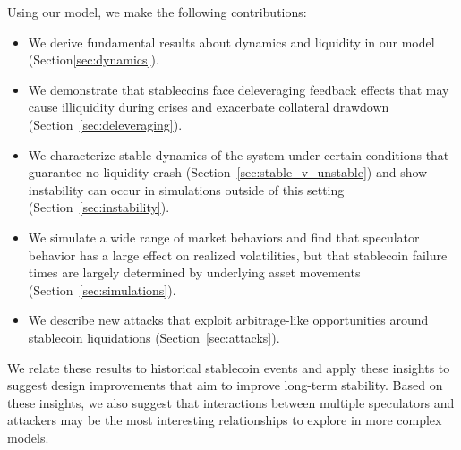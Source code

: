 Using our model, we make the following contributions:
\begin{itemize}
	\item We derive fundamental results about dynamics and liquidity in our model (Section\ref{sec:dynamics}).
	
	\item We demonstrate that stablecoins face deleveraging feedback effects that may cause illiquidity during crises and exacerbate collateral drawdown (Section~\ref{sec:deleveraging}).
	
	\item We characterize stable dynamics of the system under certain conditions that guarantee no liquidity crash (Section~\ref{sec:stable_v_unstable}) and show instability can occur in simulations outside of this setting (Section~\ref{sec:instability}).
	
	\item We simulate a wide range of market behaviors and find that speculator behavior has a large effect on realized volatilities, but that stablecoin failure times are largely determined by underlying asset movements (Section~\ref{sec:simulations}).
	
	\item We describe new attacks that exploit arbitrage-like opportunities around stablecoin liquidations (Section~\ref{sec:attacks}).
\end{itemize}
We relate these results to historical stablecoin events and apply these insights to suggest design improvements that aim to improve long-term stability. Based on these insights, we also suggest that interactions between multiple speculators and attackers may be the most interesting relationships to explore in more complex models.